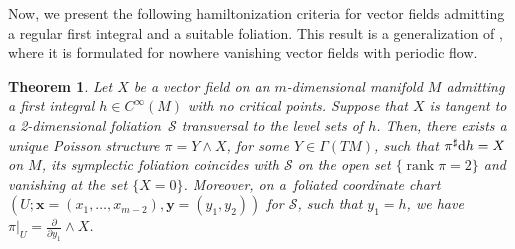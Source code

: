 \documentclass[10pt,a4paper]{amsart}
\newcommand{\dd}{{\rm d}}
\numberwithin{equation}{section}
\newtheorem{Theorem}{Theorem}[section]
\begin{document}
Now, we present the following hamiltonization criteria for vector fields admitting a regular first integral and a suitable foliation.
This result is a generalization of \cite[Theorem 2]{FGS-05}, where it is formulated for nowhere vanishing vector fields with periodic flow.

\begin{Theorem}\label{teo:RegFol}
Let $X$ be a vector field on an $m$-dimensional manifold $M$ admitting a first integral $h\in C^{\infty}(M)$ with no critical points. Suppose that $X$ is tangent to a 2-dimensional foliation~$\mathcal{S}$ transversal to the level sets of $h$. Then, there exists a unique Poisson structure $\pi=Y \wedge X$, for some $Y \in \Gamma(TM)$, such that $\pi^{\sharp}\dd h=X$ on $M$, its symplectic foliation coincides with $\mathcal{S}$ on the open set $\{\operatorname{rank}{\pi} = 2\}$ and vanishing at the set $\{X=0\}$.
Moreover, on a~foliated coordinate chart $(U;\boldsymbol{x} = (x_1,\dots,x_{m-2}),\boldsymbol{y} = (y_1,y_2))$ for $\mathcal{S}$, such that $y_1=h$, we have $\pi|_{U}=\frac{\partial}{\partial y_1}\wedge X$.
\end{Theorem}
\end{document}
